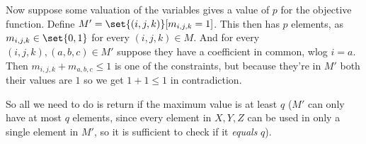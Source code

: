 Now suppose some valuation of the variables gives a value of $p$ for the objective function.
Define $M'=\set{(i,j,k)}[m_{i,j,k}=1]$.
This then has $p$ elements, as $m_{i,j,k}\in\set{0,1}$ for every $(i,j,k)\in M$.
And for every $(i,j,k),(a,b,c)\in M'$ suppose they have a coefficient in common, wlog $i=a$.
Then $m_{i,j,k}+m_{a,b,c}\leq1$ is one of the constraints, but because they're in $M'$ both their values are $1$ so we get $1+1\leq1$ in contradiction.

So all we need to do is return if the maximum value is at least $q$ ($M'$ can only have at most $q$ elements, since every element in $X,Y,Z$ can be used in only a single element in $M'$, so it is sufficient
to check if it {\it equals} $q$).

\bye

